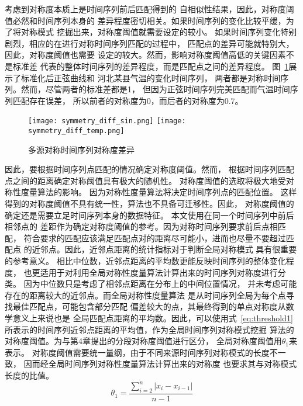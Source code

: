 考虑到对称度本质上是时间序列前后匹配得到的
自相似性结果，因此，对称度阈值必然和时间序列本身的
差异程度密切相关。如果时间序列的变化比较平缓，为了将对称模式
挖掘出来，对称度阈值就需要设定的较小。
如果时间序列变化特别剧烈，相应的在进行对称时间序列匹配的过程中，
匹配点的差异可能就特别大，因此，对称度阈值也需要
设定的较大。然而，影响对称度阈值高低的关键因素不是标准差
代表的整体时间序列的差异程度，而是匹配点之间的差异程度。
图~\ref{fig:symmetry_diff}展示了标准化后正弦曲线和
河北某县气温的变化时间序列，
两者都是对称时间序列。然而，尽管两者的标准差都是1，
但因为正弦时间序列完美匹配而气温时间序列匹配存在误差，
所以前者的对称度为0，而后者的对称度为0.7。
\begin{figure}
  \centering
  {\texttt{[image: symmetry\_diff\_sin.png]}}
  {\texttt{[image: symmetry\_diff\_temp.png]}}
  \caption{多源对称时间序列对称度差异}
  \label{fig:symmetry_diff}
\end{figure}

因此，要根据时间序列点匹配的情况确定对称度阈值。然而，
根据时间序列匹配点之间的距离确定对称阈值具有极大的随机性。
对称度阈值的选取将极大地受对称性度量算法的影响。
因为对称性度量算法将决定时间序列点的匹配位置。
这样得到的对称度阈值不具有统一性，算法也不具备可迁移性。因此，
对称度阈值的确定还是需要立足时间序列本身的数据特征。
本文使用在同一个时间序列中前后相邻点的
差距作为确定对称度阈值的参考。因为对称时间序列要求前后点相匹配，
符合要求的匹配应该满足匹配点对的距离尽可能小，进而也尽量不要超过匹配点
的近邻点。因此，近邻点距离的统计指标对于判断全局对称模式
具有很重要的参考意义。
相比中位数，近邻点距离的平均数更能反映时间序列的整体变化程度，
也更适用于对利用全局对称性度量算法计算出来的时间序列对称度进行分类。
因为中位数只是考虑了相邻点距离在分布上的中间位置情况，
并未考虑可能存在的距离较大的近邻点。而全局对称性度量算法
是从时间序列全局为每个点寻找最佳匹配点，可能包含部分匹配
偏差较大的点，其最终得到的单点对称度从数学意义上来说也是
全局匹配点距离的平均数。因此，可以使用式~\ref{eq:threshold1}
所表示的时间序列近邻点距离的平均值，作为全局时间序列对称模式挖掘
算法的对称度阈值。为与第4章提出的分段对称度阈值进行区分，
全局对称度阈值用$\theta_1$来表示。
对称度阈值需要统一量纲，由于不同来源时间序列对称模式的长度不一致，
因而经全局时间序列对称性度量算法计算出来的对称度
也要求其与对称模式长度的比值。
\begin{equation}
  \theta_{1}=\frac{\sum_{i=2}^{n}\left|x_{i}-x_{i-1}\right|}{n-1}
  \label{eq:threshold1}
\end{equation}

